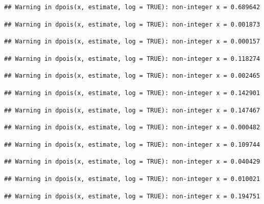 \documentclass[]{article}
\begin{document}
\begin{verbatim}
## Warning in dpois(x, estimate, log = TRUE): non-integer x = 0.689642
\end{verbatim}

\begin{verbatim}
## Warning in dpois(x, estimate, log = TRUE): non-integer x = 0.001873
\end{verbatim}

\begin{verbatim}
## Warning in dpois(x, estimate, log = TRUE): non-integer x = 0.000157
\end{verbatim}

\begin{verbatim}
## Warning in dpois(x, estimate, log = TRUE): non-integer x = 0.118274
\end{verbatim}

\begin{verbatim}
## Warning in dpois(x, estimate, log = TRUE): non-integer x = 0.002465
\end{verbatim}

\begin{verbatim}
## Warning in dpois(x, estimate, log = TRUE): non-integer x = 0.142901
\end{verbatim}

\begin{verbatim}
## Warning in dpois(x, estimate, log = TRUE): non-integer x = 0.147467
\end{verbatim}

\begin{verbatim}
## Warning in dpois(x, estimate, log = TRUE): non-integer x = 0.000482
\end{verbatim}

\begin{verbatim}
## Warning in dpois(x, estimate, log = TRUE): non-integer x = 0.109744
\end{verbatim}

\begin{verbatim}
## Warning in dpois(x, estimate, log = TRUE): non-integer x = 0.040429
\end{verbatim}

\begin{verbatim}
## Warning in dpois(x, estimate, log = TRUE): non-integer x = 0.010021
\end{verbatim}

\begin{verbatim}
## Warning in dpois(x, estimate, log = TRUE): non-integer x = 0.194751
\end{verbatim}
\end{document}

